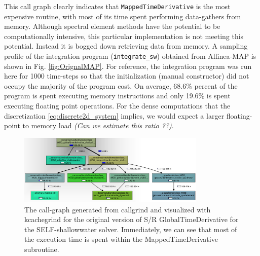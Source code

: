 \documentclass{softwaremanual}
\begin{document}
 This call graph clearly indicates that \texttt{MappedTimeDerivative} is the most expensive routine, with most of its time spent performing data-gathers from memory. Although spectral element methods have the potential to be computationally intensive, this particular implementation is not meeting this potential. Instead it is bogged down retrieving data from memory. A sampling profile of the integration program (\texttt{integrate\_sw}) obtained from Allinea-MAP is shown in Fig. \ref{fig:OrignalMAP}. For reference, the integration program was run here for 1000 time-steps so that the initialization (manual constructor) did not occupy the majority of the program cost. On average, 68.6\% percent of the program is spent executing memory instructions and only 19.6\% is spent executing floating point operations. For the dense computations that the discretization \eqref{eq:discrete2d_system} implies, we would expect a larger floating-point to memory load \textit{(Can we estimate this ratio ??)}.
 
\begin{figure}
\begin{center}
\includegraphics[width=0.8\textwidth]{projectFigures/callgraphOriginal.png}
\caption{The call-graph generated from callgrind and visualized with kcachegrind for the original version of S/R GlobalTimeDerivative for the SELF-shallowwater solver. Immediately, we can see that most of the execution time is spent within the MappedTimeDerivative subroutine.}\label{fig:OrignalCallGraph}
\end{center}
\end{figure}
\end{document}
